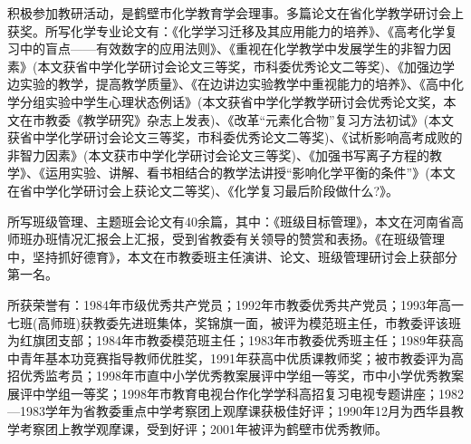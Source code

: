 \documentclass[openany]{ctexbook}
\begin{document}
积极参加教研活动，是鹤壁市化学教育学会理事。多篇论文在省化学教学研讨会上获奖。所写化学专业论文有：《化学学习迁移及其应用能力的培养》、《高考化学复习中的盲点------有效数字的应用法则》、《重视在化学教学中发展学生的非智力因素》(本文获省中学化学研讨会论文三等奖，市科委优秀论文二等奖)、《加强边学边实验的教学，提高教学质量》、《在边讲边实验教学中重视能力的培养》、《高中化学分组实验中学生心理状态例话》(本文获省中学化学教学研讨会优秀论文奖，本文在市教委《教学研究》杂志上发表)、《改革``元素化合物''复习方法初试》(本文获省中学化学研讨会论文三等奖，市科委优秀论文二等奖)、《试析影响高考成败的非智力因素》(本文获市中学化学研讨会论文三等奖)、《加强书写离子方程的教学》、《运用实验、讲解、看书相结合的教学法讲授``影响化学平衡的条件''》(本文在省中学化学研讨会上获论文二等奖)、《化学复习最后阶段做什么?》。

所写班级管理、主题班会论文有40余篇，其中：《班级目标管理》，本文在河南省高师班办班情况汇报会上汇报，受到省教委有关领导的赞赏和表扬。《在班级管理中，坚持抓好德育》，本文在市教委班主任演讲、论文、班级管理研讨会上获部分第一名。

所获荣誉有：1984年市级优秀共产党员；1992年市教委优秀共产党员；1993年高一七班(高师班)获教委先进班集体，奖锦旗一面，被评为模范班主任，市教委评该班为红旗团支部；1984年市教委模范班主任；1983年市教委优秀班主任；1989年获高中青年基本功竞赛指导教师优胜奖，1991年获高中优质课教师奖；被市教委评为高招优秀监考员；1998年市直中小学优秀教案展评中学组一等奖，市中小学优秀教案展评中学组一等奖；1998年市教育电视台作化学学科高招复习电视专题讲座；1982---1983学年为省教委重点中学考察团上观摩课获极佳好评；1990年12月为西华县教学考察团上教学观摩课，受到好评；2001年被评为鹤壁市优秀教师。

\backmatter
\printindex
\end{document}

